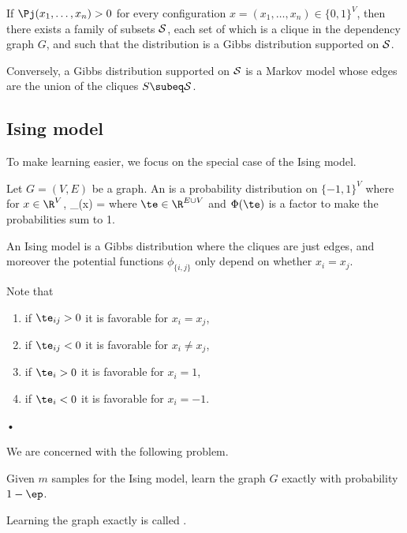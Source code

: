\begin{thm}
If $\Pj(x_1,\ldots, x_n)>0$ for every configuration $x=(x_1,\ldots, x_n)\in \{0,1\}^V$, then there exists a family of subsets $\cal S$, each set of which is a clique in the dependency graph $G$, and such that the distribution is a Gibbs distribution supported on $\cal S$. 

Conversely, a Gibbs distribution supported on $\cal S$ is a Markov model whose edges are the union of the cliques $S\subeq \cal S$.
\end{thm}

\subsection{Ising model}

To make learning easier, we focus on the special case of the Ising model.
\begin{df}
Let $G=(V,E)$ be a graph. An  is a probability distribution on $\{-1,1\}^V$ where for $x\in \R^V$,
\Pj_\te(x) = \exp{}
\eeq
where $\te\in \R^{E\cup V}$ %
and $\Phi(\te)$ is a factor to make the probabilities sum to 1.
\end{df}
An Ising model is a Gibbs distribution where the cliques are just edges, and moreover the potential functions $\phi_{\{i,j\}}$ only depend on whether $x_i=x_j$.

Note that 
\begin{enumerate}
\item
if $\te_{ij}>0$ it is favorable for $x_i=x_j$,
\item
if $\te_{ij}<0$ it is favorable for $x_i\ne x_j$,
\item
if $\te_i>0$ it is favorable for $x_i=1$,
\item
if $\te_i<0$ it is favorable for $x_i=-1$.
\end{enumerate}•

We are concerned with the following problem. 
\begin{prb*}
Given $m$ samples for the Ising model, learn the graph $G$ exactly with probability $1-\ep$.
\end{prb*}
Learning the graph exactly is called .

